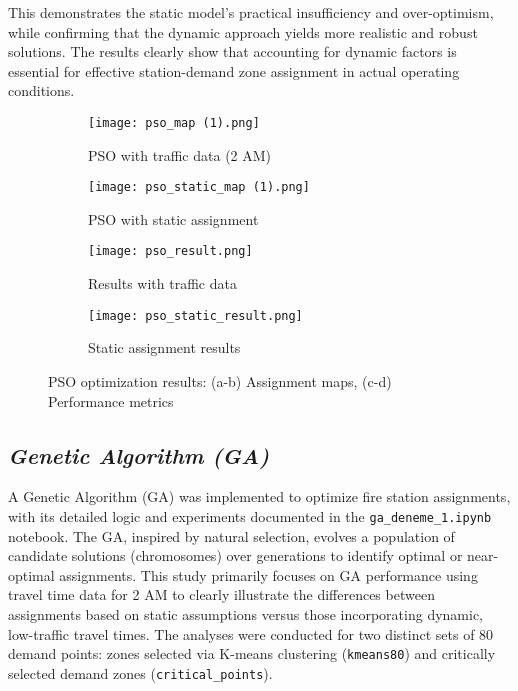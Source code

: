 \documentclass[conference]{IEEEtran}
\begin{document}
This demonstrates the static model's practical insufficiency and over-optimism, while confirming that the dynamic approach yields more realistic and robust solutions. The results clearly show that accounting for dynamic factors is essential for effective station-demand zone assignment in actual operating conditions.


\begin{figure}[htbp]
    \centering
    \begin{subfigure}[b]{0.48\textwidth}
        \centering
        \texttt{[image: pso\_map (1).png]}
        \caption{PSO with traffic data (2 AM)}
        \label{fig:pso_dynamic}
    \end{subfigure}
    \hfill
    \begin{subfigure}[b]{0.48\textwidth}
        \centering
        \texttt{[image: pso\_static\_map (1).png]}
        \caption{PSO with static assignment}
        \label{fig:pso_static}
    \end{subfigure}
    
    \vspace{1em}
    
    \begin{subfigure}[b]{0.48\textwidth}
        \centering
        \texttt{[image: pso\_result.png]}
        \caption{Results with traffic data}
        \label{fig:pso_dynamic_result}
    \end{subfigure}
    \hfill
    \begin{subfigure}[b]{0.48\textwidth}
        \centering
        \texttt{[image: pso\_static\_result.png]}
        \caption{Static assignment results}
        \label{fig:pso_static_result}
    \end{subfigure}
    
    \caption{PSO optimization results: (a-b) Assignment maps, (c-d) Performance metrics}
    \label{fig:pso_results}
\end{figure}

\subsection{\textit{Genetic Algorithm (GA)}}
A Genetic Algorithm (GA) was implemented to optimize fire station assignments, with its detailed logic and experiments documented in the \texttt{ga\_deneme\_1.ipynb} notebook. The GA, inspired by natural selection, evolves a population of candidate solutions (chromosomes) over generations to identify optimal or near-optimal assignments. This study primarily focuses on GA performance using travel time data for 2 AM to clearly illustrate the differences between assignments based on static assumptions versus those incorporating dynamic, low-traffic travel times. The analyses were conducted for two distinct sets of 80 demand points: zones selected via K-means clustering (\texttt{kmeans80}) and critically selected demand zones (\texttt{critical\_points}).
\end{document}
